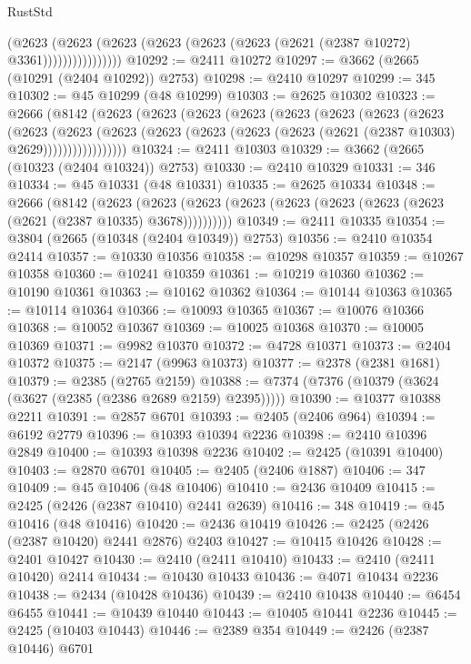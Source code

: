 \begin{lexlean}{RustStd}
\begin{coremodule}
                      (@2623
                        (@2623
                          (@2623 (@2623 (@2623 (@2623 (@2621 (@2387 @10272) @3361))))))))))))))))
@10292 := @2411 @10272
@10297 := @3662 (@2665 (@10291 (@2404 @10292)) @2753)
@10298 := @2410 @10297
@10299 := 345
@10302 := @45 @10299 (@48 @10299)
@10303 := @2625 @10302
@10323 := @2666
    (@8142
      (@2623
        (@2623
          (@2623
            (@2623
              (@2623
                (@2623
                  (@2623
                    (@2623
                      (@2623
                        (@2623
                          (@2623
                            (@2623 (@2623 (@2623 (@2623 (@2621 (@2387 @10303) @2629)))))))))))))))))
@10324 := @2411 @10303
@10329 := @3662 (@2665 (@10323 (@2404 @10324)) @2753)
@10330 := @2410 @10329
@10331 := 346
@10334 := @45 @10331 (@48 @10331)
@10335 := @2625 @10334
@10348 := @2666
    (@8142
      (@2623 (@2623 (@2623 (@2623 (@2623 (@2623 (@2623 (@2623 (@2621 (@2387 @10335) @3678))))))))))
@10349 := @2411 @10335
@10354 := @3804 (@2665 (@10348 (@2404 @10349)) @2753)
@10356 := @2410 @10354 @2414
@10357 := @10330 @10356
@10358 := @10298 @10357
@10359 := @10267 @10358
@10360 := @10241 @10359
@10361 := @10219 @10360
@10362 := @10190 @10361
@10363 := @10162 @10362
@10364 := @10144 @10363
@10365 := @10114 @10364
@10366 := @10093 @10365
@10367 := @10076 @10366
@10368 := @10052 @10367
@10369 := @10025 @10368
@10370 := @10005 @10369
@10371 := @9982 @10370
@10372 := @4728 @10371
@10373 := @2404 @10372
@10375 := @2147 (@9963 @10373)
@10377 := @2378 (@2381 @1681)
@10379 := @2385 (@2765 @2159)
@10388 := @7374 (@7376 (@10379 (@3624 (@3627 (@2385 (@2386 @2689 @2159) @2395)))))
@10390 := @10377 @10388 @2211
@10391 := @2857 @6701
@10393 := @2405 (@2406 @964)
@10394 := @6192 @2779
@10396 := @10393 @10394 @2236
@10398 := @2410 @10396 @2849
@10400 := @10393 @10398 @2236
@10402 := @2425 (@10391 @10400)
@10403 := @2870 @6701
@10405 := @2405 (@2406 @1887)
@10406 := 347
@10409 := @45 @10406 (@48 @10406)
@10410 := @2436 @10409
@10415 := @2425 (@2426 (@2387 @10410) @2441 @2639)
@10416 := 348
@10419 := @45 @10416 (@48 @10416)
@10420 := @2436 @10419
@10426 := @2425 (@2426 (@2387 @10420) @2441 @2876) @2403
@10427 := @10415 @10426
@10428 := @2401 @10427
@10430 := @2410 (@2411 @10410)
@10433 := @2410 (@2411 @10420) @2414
@10434 := @10430 @10433
@10436 := @4071 @10434 @2236
@10438 := @2434 (@10428 @10436)
@10439 := @2410 @10438
@10440 := @6454 @6455
@10441 := @10439 @10440
@10443 := @10405 @10441 @2236
@10445 := @2425 (@10403 @10443)
@10446 := @2389 @354
@10449 := @2426 (@2387 @10446) @6701

\end{coremodule}
\end{lexlean}
